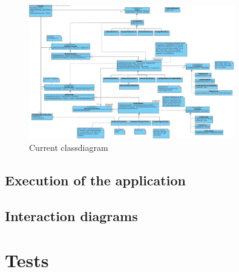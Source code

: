 \documentclass[i2]{oss}
\begin{document}
\begin{figure}[tbp]
\begin{center}
    \includegraphics[width=0.8\textwidth]{klassendiagram3}
    \caption{Current classdiagram}
	\label{fig:kd-h}
\end{center}
\end{figure}



\subsection{Execution of the application}


\subsection{Interaction diagrams}
\label{ssec:Interactiedia}




\section{Tests}
\label{ssec:tests}
\end{document}
